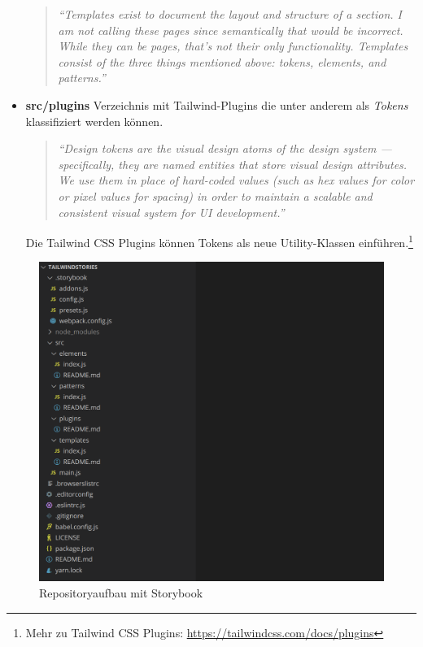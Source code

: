 \begin{itemize}
    \begin{quotation}
        \emph{``Templates exist to document the layout and structure of a section. I am not calling these pages since semantically that would be incorrect. While they can be pages, that’s not their only functionality. Templates consist of the three things mentioned above: tokens, elements, and patterns.''} \citep{VUEDSTemplates}
    \end{quotation}
    \item \textbf{src/plugins}\newline
    Verzeichnis mit Tailwind-Plugins die unter anderem als \textit{Tokens} klassifiziert werden können.
    \begin{quotation}
        \emph{``Design tokens are the visual design atoms of the design system — specifically, they are named entities that store visual design attributes. We use them in place of hard-coded values (such as hex values for color or pixel values for spacing) in order to maintain a scalable and consistent visual system for UI development.''} \citep{DesignTokens}
    \end{quotation}
    Die Tailwind CSS Plugins können Tokens als neue Utility-Klassen einführen.\footnote{Mehr zu Tailwind CSS Plugins: \url{https://tailwindcss.com/docs/plugins}}
\end{itemize}

\begin{figure}[!ht]
	\centering
		\includegraphics[width=.85\textwidth]{images/004-000-001-repo-storybook.png}
	\caption{Repositoryaufbau mit Storybook}
	\label{fig:repoStorybook}
\end{figure}

